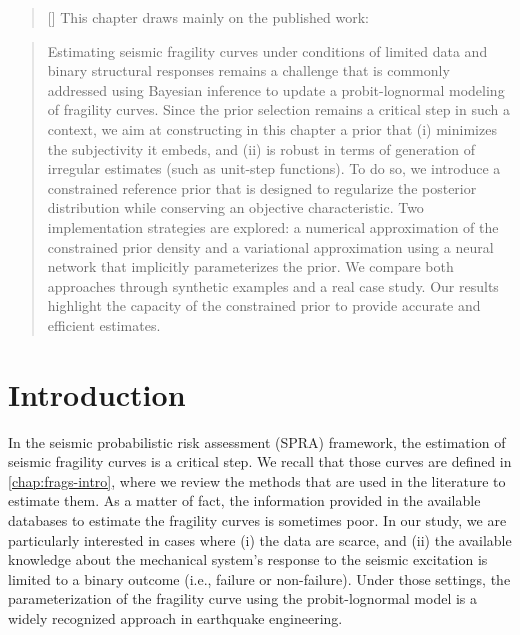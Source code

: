


\begin{abstract}[\hspace*{-10pt}]
    This chapter draws mainly on the published work:   %
\end{abstract}

\begin{abstract}
Estimating seismic fragility curves under conditions of limited data and binary structural responses remains a challenge that is commonly addressed using Bayesian inference to update a probit-lognormal modeling of fragility curves.
Since the prior selection remains a critical step in such a context, we aim at constructing in this chapter a prior that (i) minimizes the subjectivity it embeds, and (ii) is robust in terms of generation of irregular estimates (such as unit-step functions).
To do so, we introduce 
a constrained reference prior that is designed to regularize the posterior distribution while conserving an objective characteristic.
Two implementation strategies are explored: a numerical approximation of the constrained prior density and a variational approximation using a neural network that implicitly parameterizes the prior. %
We compare both approaches through synthetic examples and a real case study.
Our results highlight the capacity of the constrained prior to provide accurate and efficient estimates.
%
\end{abstract}

\minitoc


\section{Introduction}


In the seismic probabilistic risk assessment (SPRA) framework, the estimation of seismic fragility curves is a critical step. 
We recall that those curves are defined in   \cref{chap:frags-intro}, where we review the methods that are used in the literature to estimate them.
As a matter of fact, the information provided in the available databases to estimate the fragility curves is sometimes poor.
In our study, we are particularly interested in cases where
(i) the data are scarce, and (ii) the available knowledge about the mechanical system's response to the seismic excitation is limited to a binary outcome (i.e., failure or non-failure).
Under those settings, the parameterization of the fragility curve using the probit-lognormal model is a widely recognized approach in earthquake engineering.




